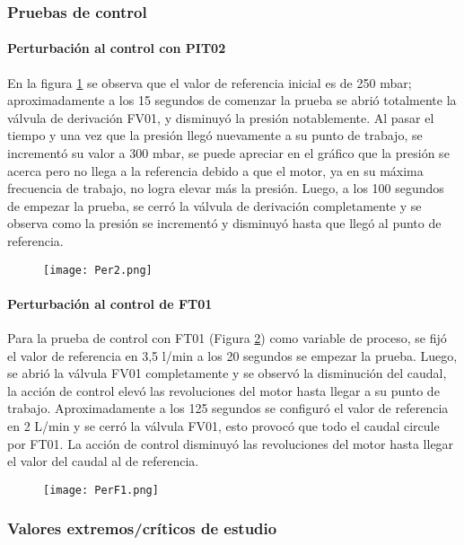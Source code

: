 {\subsubsection{Pruebas de control}
\paragraph{Perturbación al control con PIT02}
En la figura \ref{fig:per2} se observa que el valor de referencia inicial es de 250 mbar; aproximadamente a los 15 segundos de comenzar la prueba se abrió totalmente la válvula de derivación FV01, y disminuyó la presión notablemente. Al pasar el tiempo y una vez que la presión llegó nuevamente a su punto de trabajo, se incrementó su valor a 300 mbar, se puede apreciar en el gráfico que la presión se acerca pero no llega a la referencia debido a que el motor, ya en su máxima frecuencia de trabajo, no logra elevar más la presión. Luego, a los 100 segundos de empezar la prueba, se cerró la válvula de derivación completamente y se observa como la presión se incrementó y disminuyó hasta que llegó al punto de referencia.
\begin{figure}[h!]
	\centering
	\texttt{[image: Per2.png]}
	\label{fig:per2}
\end{figure}

\paragraph{Perturbación al control de FT01}
Para la prueba de control con FT01 (Figura \ref{fig:per1}) como variable de proceso, se fijó el valor de referencia en 3,5 l/min a los 20 segundos se empezar la prueba. Luego, se abrió la válvula FV01 completamente y se observó la disminución del caudal, la acción de control elevó las revoluciones del motor hasta llegar a su punto de trabajo. Aproximadamente a los 125 segundos se configuró el valor de referencia en 2 L/min y se cerró la válvula FV01, esto provocó que todo el caudal circule por FT01. La acción de control disminuyó las revoluciones del motor hasta llegar el valor del caudal al de referencia.

\begin{figure}[h!]
	\centering
	\texttt{[image: PerF1.png]}
	\label{fig:per1}
\end{figure}


\subsubsection{Valores extremos/críticos de estudio}

}
